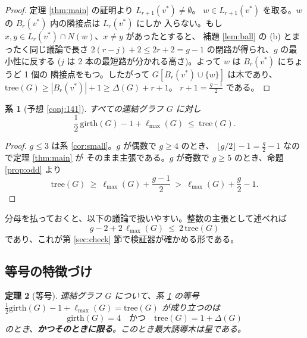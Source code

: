 \documentclass[paper=a4,fontsize=10.5pt,jafontsize=10.5pt]{jlreq}
\theoremstyle{plain}
\newtheorem{theorem}{定理}[section]
\newtheorem{corollary}[theorem]{系}
\theoremstyle{definition}
\begin{document}
\begin{proof}
定理 \ref{thm:main} の証明より $L_{r+1}(v^*) \ne \emptyset$。
$w \in L_{r+1}(v^*)$ を取る。$w$ の $B_r(v^*)$ 内の隣接点は $L_r(v^*)$ にしか
入らない。もし $x, y \in L_r(v^*) \cap N(w)$、$x \ne y$ があったとすると、
補題 \ref{lem:ball} の (b) とまったく同じ議論で長さ
$2(r - j) + 2 \le 2r + 2 = g - 1$ の閉路が得られ、$g$ の最小性に反する
($j$ は 2 本の最短路が分かれる高さ)。よって $w$ は $B_r(v^*)$ にちょうど 1 個の
隣接点をもつ。したがって $G[B_r(v^*) \cup \{w\}]$ は木であり、
$\mathrm{tree}(G) \ge |B_r(v^*)| + 1 \ge \Delta(G) + r + 1$。
$r + 1 = \tfrac{g-1}{2}$ である。
\end{proof}

\begin{corollary}[予想 \ref{conj:141}]\label{cor:main}
すべての連結グラフ $G$ に対し
\[ \frac{1}{2}\,\mathrm{girth}(G) - 1 + \ell_{\max}(G)
   \ \le \ \mathrm{tree}(G) . \]
\end{corollary}

\begin{proof}
$g \le 3$ は系 \ref{cor:small}。$g$ が偶数で $g \ge 4$ のとき、
$\lfloor g/2 \rfloor - 1 = \tfrac{g}{2} - 1$ なので定理 \ref{thm:main} が
そのまま主張である。$g$ が奇数で $g \ge 5$ のとき、命題 \ref{prop:odd} より
\[ \mathrm{tree}(G) \ \ge \ \ell_{\max}(G) + \frac{g-1}{2}
   \ > \ \ell_{\max}(G) + \frac{g}{2} - 1 . \]
\end{proof}

分母を払っておくと、以下の議論で扱いやすい。整数の主張として述べれば
\begin{equation}\label{eq:int}
g - 2 + 2\,\ell_{\max}(G) \ \le \ 2\,\mathrm{tree}(G)
\end{equation}
であり、これが第 \ref{sec:check} 節で検証器が確かめる形である。

\subsection{等号の特徴づけ}

\begin{theorem}[等号]\label{thm:eq}
連結グラフ $G$ について、系 \ref{cor:main} の等号
$\tfrac{1}{2}\mathrm{girth}(G) - 1 + \ell_{\max}(G) = \mathrm{tree}(G)$
が成り立つのは
\[ \mathrm{girth}(G) = 4 \quad\text{かつ}\quad
   \mathrm{tree}(G) = 1 + \Delta(G) \]
のとき、\textbf{かつそのときに限る}。このとき最大誘導木は星である。
\end{theorem}
\end{document}

